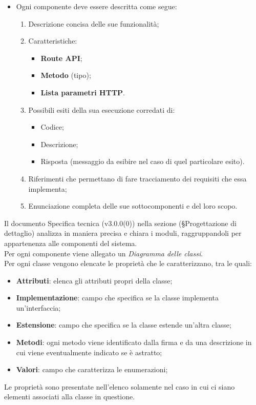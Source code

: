 \documentclass[10pt, a4paper]{article}
\begin{document}
\begin{itemize}
    \item Ogni componente deve essere descritta come segue:
    \begin{enumerate}
        \item Descrizione concisa delle sue funzionalità;
        \item Caratteristiche:
        \begin{itemize}
            \item \textbf{Route API};
            \item \textbf{Metodo} (tipo);
            \item \textbf{Lista parametri HTTP}.
        \end{itemize}
        \item Possibili esiti della sua esecuzione corredati di:
        \begin{itemize}
            \item Codice;
            \item Descrizione;
            \item Risposta (messaggio da esibire nel caso di quel particolare esito). 
        \end{itemize}
        \item Riferimenti che permettano di fare tracciamento dei requisiti che essa implementa;
        \item Enunciazione completa delle sue sottocomponenti e del loro scopo.
    \end{enumerate} 
\end{itemize}
Il documento Specifica tecnica (v3.0.0(0)) nella sezione (\S Progettazione di dettaglio) analizza in maniera precisa e chiara i moduli, raggruppandoli per appartenenza alle componenti del sistema.\\
Per ogni componente viene allegato un \textit{Diagramma delle classi}.\\
Per ogni classe vengono elencate le proprietà che le caratterizzano, tra le quali:
\begin{itemize}
    \item \textbf{Attributi}: elenca gli attributi propri della classe;
    \item \textbf{Implementazione}: campo che specifica se la classe implementa un'interfaccia;
    \item \textbf{Estensione}: campo che specifica se la classe estende un'altra classe;
    \item \textbf{Metodi}: ogni metodo viene identificato dalla firma e da una descrizione in cui viene eventualmente indicato se è astratto;
    \item \textbf{Valori}: campo che caratterizza le enumerazioni;
    \end{itemize}
Le proprietà sono presentate nell'elenco solamente nel caso in cui ci siano elementi associati alla classe in questione.
\end{document}
